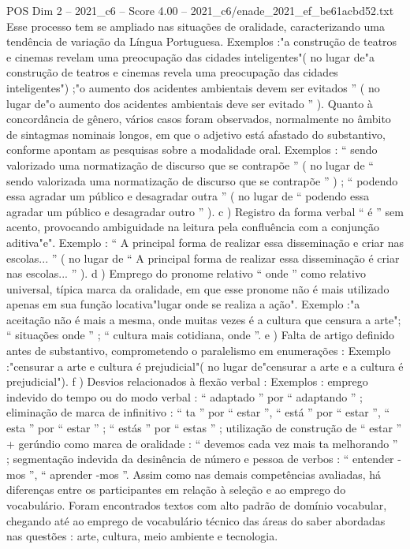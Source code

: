 \begin{textsample}{POS Dim 2 – 2021\_c6 – Score 4.00 – 2021\_c6/enade\_2021\_ef\_be61acbd52.txt}
Esse processo tem se ampliado nas situações de oralidade, caracterizando uma tendência de variação da Língua Portuguesa.
Exemplos :"a construção de teatros e cinemas revelam uma preocupação das cidades inteligentes"( no lugar de"a construção de teatros e cinemas revela uma preocupação das cidades inteligentes") ;"o aumento dos acidentes ambientais devem ser evitados ” ( no lugar de"o aumento dos acidentes ambientais deve ser evitado ” ).
Quanto à concordância de gênero, vários casos foram observados, normalmente no âmbito de sintagmas nominais longos, em que o adjetivo está afastado do substantivo, conforme apontam as pesquisas sobre a modalidade oral.
Exemplos : “ sendo valorizado uma normatização de discurso que se contrapõe ” ( no lugar de “ sendo valorizada uma normatização de discurso que se contrapõe ” ) ; “ podendo essa agradar um público e desagradar outra ” ( no lugar de “ podendo essa agradar um público e desagradar outro ” ). c ) Registro da forma verbal “ é ” sem acento, provocando ambiguidade na leitura pela confluência com a conjunção aditiva"e".
Exemplo : “ A principal forma de realizar essa disseminação e criar nas escolas... ” ( no lugar de “ A principal forma de realizar essa disseminação é criar nas escolas... ” ). d ) Emprego do pronome relativo “ onde ” como relativo universal, típica marca da oralidade, em que esse pronome não é mais utilizado apenas em sua função locativa"lugar onde se realiza a ação".
Exemplo :"a aceitação não é mais a mesma, onde muitas vezes é a cultura que censura a arte"; “ situações onde ” ; “ cultura mais cotidiana, onde ”. e ) Falta de artigo definido antes de substantivo, comprometendo o paralelismo em enumerações : Exemplo :"censurar a arte e cultura é prejudicial"( no lugar de"censurar a arte e a cultura é prejudicial"). f ) Desvios relacionados à flexão verbal : Exemplos : emprego indevido do tempo ou do modo verbal : “ adaptado ” por “ adaptando ” ; eliminação de marca de infinitivo : “ ta ” por “ estar ”, “ está ” por “ estar ”, “ esta ” por “ estar ” ; “ estás ” por “ estas ” ; utilização de construção de “ estar ” + gerúndio como marca de oralidade : “ devemos cada vez mais ta melhorando ” ; segmentação indevida da desinência de número e pessoa de verbos : “ entender -mos ”, “ aprender -mos ”.
Assim como nas demais competências avaliadas, há diferenças entre os participantes em relação à seleção e ao emprego do vocabulário.
Foram encontrados textos com alto padrão de domínio vocabular, chegando até ao emprego de vocabulário técnico das áreas do saber abordadas nas questões : arte, cultura, meio ambiente e tecnologia.

\end{textsample}
